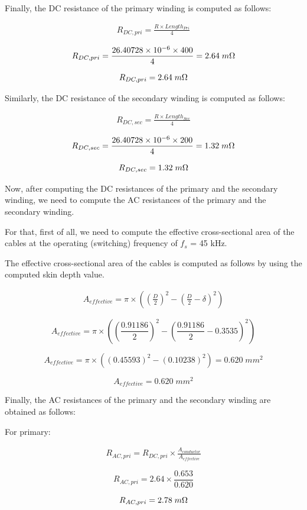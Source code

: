 Finally, the DC resistance of the primary winding is computed as follows:

\begin{align}
    R_{DC,pri} = \frac{R\times Length_{Pri}}{4} 
\end{align}

$$ R_{DC,pri} = \frac{26.40728\times 10^{-6}\times 400}{4} = 2.64\;m\ohm $$

$$ R_{DC,pri} = 2.64\;m\ohm $$

Similarly, the DC resistance of the secondary winding is computed as follows:

\begin{align}
    R_{DC,sec} = \frac{R\times Length_{Sec}}{4} 
\end{align}

$$ R_{DC,sec} = \frac{26.40728\times 10^{-6}\times 200}{4} = 1.32\;m\ohm $$

$$ R_{DC,sec} = 1.32\;m\ohm $$

Now, after computing the DC resistances of the primary and the secondary winding, we need to compute the AC resistances of the primary and the secondary winding.

For that, first of all, we need to compute the effective cross-sectional area of the cables at the operating (switching) frequency of $f_s$ = 45 kHz.

The effective cross-sectional area of the cables is computed as follows by using the computed skin depth value.

\begin{align}
    A_{effective} = \pi\times ((\frac{D}{2})^2 - (\frac{D}{2} - \delta)^2)
\end{align}

$$ A_{effective} = \pi\times ((\frac{0.91186}{2})^2 - (\frac{0.91186}{2} - 0.3535)^2) $$

$$ A_{effective} = \pi\times ((0.45593)^2 - (0.10238)^2) = 0.620\;mm^2 $$

$$ A_{effective} = 0.620\;mm^2 $$

Finally, the AC resistances of the primary and the secondary winding are obtained as follows:

For primary:

\begin{align}
    R_{AC,pri} = R_{DC,pri}\times \frac{A_{conductor}}{A_{effective}}
\end{align}

$$ R_{AC,pri} = 2.64\times \frac{0.653}{0.620} $$

$$ R_{AC,pri} = 2.78\;m\ohm $$

